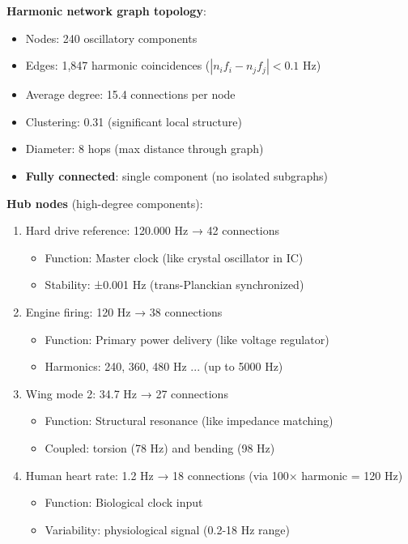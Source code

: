 \documentclass[11pt,a4paper]{article}
\begin{document}
\textbf{Harmonic network graph topology}:
\begin{itemize}
\item Nodes: 240 oscillatory components
\item Edges: 1,847 harmonic coincidences ($|n_i f_i - n_j f_j| < 0.1$ Hz)
\item Average degree: 15.4 connections per node
\item Clustering: 0.31 (significant local structure)
\item Diameter: 8 hops (max distance through graph)
\item \textbf{Fully connected}: single component (no isolated subgraphs)
\end{itemize}

\textbf{Hub nodes} (high-degree components):
\begin{enumerate}
\item Hard drive reference: 120.000 Hz → 42 connections
\begin{itemize}
\item Function: Master clock (like crystal oscillator in IC)
\item Stability: ±0.001 Hz (trans-Planckian synchronized)
\end{itemize}

\item Engine firing: 120 Hz → 38 connections
\begin{itemize}
\item Function: Primary power delivery (like voltage regulator)
\item Harmonics: 240, 360, 480 Hz ... (up to 5000 Hz)
\end{itemize}

\item Wing mode 2: 34.7 Hz → 27 connections
\begin{itemize}
\item Function: Structural resonance (like impedance matching)
\item Coupled: torsion (78 Hz) and bending (98 Hz)
\end{itemize}

\item Human heart rate: 1.2 Hz → 18 connections (via 100× harmonic = 120 Hz)
\begin{itemize}
\item Function: Biological clock input
\item Variability: physiological signal (0.2-18 Hz range)
\end{itemize}
\end{enumerate}
\end{document}
